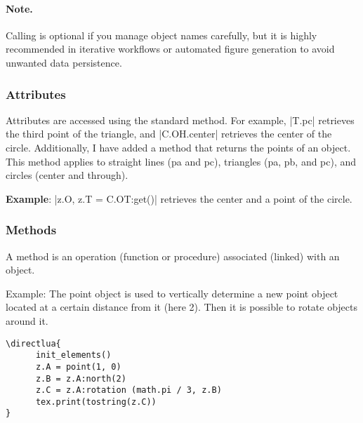 \paragraph{Note.}
Calling  is optional if you manage object names carefully, but it is highly recommended in iterative workflows or automated figure generation to avoid unwanted data persistence.

\subsubsection{Attributes}
 \label{ssub:attributes}

Attributes are accessed using the standard method. For example, |T.pc| retrieves the third point of the triangle, and |C.OH.center| retrieves the center of the circle. Additionally, I have added a method  that returns the points of an object. This method applies to straight lines (pa and pc), triangles (pa, pb, and pc), and circles (center and through).

\vspace{1em}
\noindent
  \textbf{Example}: |z.O, z.T = C.OT:get()| retrieves the center and a point of the circle.

\subsubsection{Methods}
\label{ssub:methods}

A method is an operation (function or procedure) associated (linked) with an object.

Example:   The point object is used to vertically determine a new point object located at a certain distance from it (here 2). Then it is possible to rotate objects around it.

\begin{verbatim}
\directlua{
      init_elements()
      z.A = point(1, 0)
      z.B = z.A:north(2)
      z.C = z.A:rotation (math.pi / 3, z.B)
      tex.print(tostring(z.C))
}
\end{verbatim}

\endinput